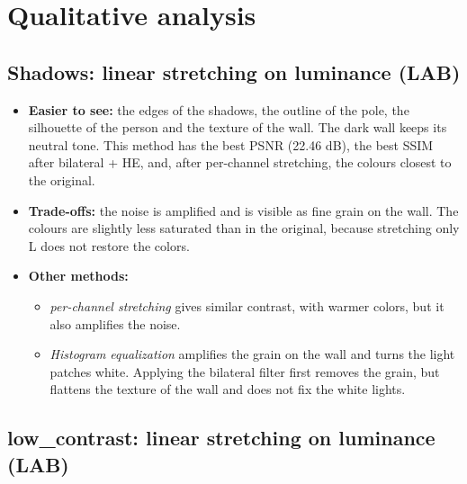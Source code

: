 \documentclass[11pt,a4paper]{article}
\begin{document}
\section{Qualitative analysis}

\subsection{Shadows: linear stretching on luminance (LAB)}

\begin{itemize}
  \item \textbf{Easier to see:} the edges of the shadows, the outline of the pole, the silhouette of the person and the texture of the wall. The dark wall keeps its neutral tone. This method has the best PSNR (22.46 dB), the best SSIM after bilateral + HE, and, after per-channel stretching, the colours closest to the original.
  \item \textbf{Trade-offs:} the noise is amplified and is visible as fine grain on the wall. The colours are slightly less saturated than in the original, because stretching only L does not restore the colors.
  \item \textbf{Other methods:}
  \begin{itemize}
    \item \emph{per-channel stretching} gives similar contrast, with warmer colors, but it also amplifies the noise.
    \item \emph{Histogram equalization} amplifies the grain on the wall and turns the light patches white. Applying the bilateral filter first removes the grain, but flattens the texture of the wall and does not fix the white lights.
  \end{itemize}
\end{itemize}

\subsection{low\_contrast: linear stretching on luminance (LAB)}
\end{document}
